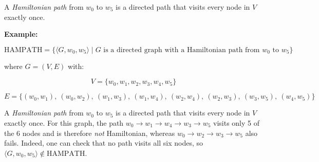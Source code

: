 \documentclass[12pt,a4paper,openany]{article}
\begin{document}
A \emph{Hamiltonian path} from $w_0$ to $w_5$ is a directed path that visits every node in $V$ exactly once.

\textbf{Example: }

\[\text{HAMPATH} = \{ \langle G, w_0, w_5 \rangle \mid G \text{ is a directed graph with a Hamiltonian path from } w_0 \text{ to } w_5 \} \]

\begin{center}
\end{center}

where $G = (V, E)$ with:

\[
V = \{w_0, w_1, w_2, w_3, w_4, w_5\}
\]

\[
E = \{(w_0,w_1),\ (w_0,w_2),\ (w_1,w_3),\ (w_1,w_4),\ (w_2,w_4),\ (w_2,w_3),\ (w_3,w_5),\ (w_4,w_5)\}
\]

A \emph{Hamiltonian path} from $w_0$ to $w_5$ is a directed path that visits every node in $V$ exactly once.
For this graph, the path $w_0 \to w_1 \to w_4 \to w_3 \to w_5$ visits only 5 of the 6 nodes and is therefore \emph{not} Hamiltonian, whereas $w_0 \to w_2 \to w_3 \to w_5$ also fails. Indeed, one can check that no path visits all six nodes, so $\langle G, w_0, w_5 \rangle \notin \text{HAMPATH}$.

\begin{center}
\end{center}
\end{document}
